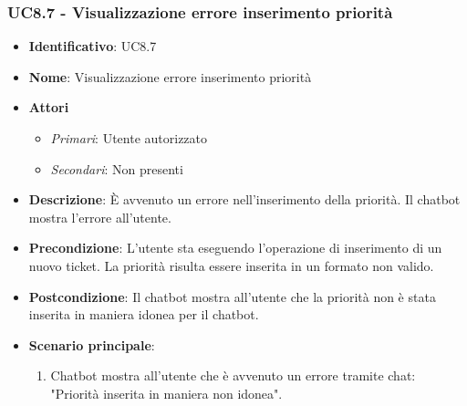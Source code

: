 \subsubsection{UC8.7 - Visualizzazione errore inserimento priorità}
\begin{itemize}
	\item \textbf{Identificativo}: UC8.7
	\item \textbf{Nome}:  Visualizzazione errore inserimento priorità
	\item \textbf{Attori}
	\begin{itemize} 
		\item \textit{Primari}: Utente autorizzato
		\item \textit{Secondari}: Non presenti
	\end{itemize}
	\item \textbf{Descrizione}: È avvenuto un errore nell'inserimento della priorità. Il chatbot mostra l'errore all'utente.
	\item \textbf{Precondizione}: L'utente sta eseguendo l'operazione di inserimento di un nuovo ticket. La priorità risulta essere inserita in un formato non valido. 
	\item \textbf{Postcondizione}: Il chatbot mostra all'utente che la priorità non è stata inserita in maniera idonea per il chatbot.
	\item \textbf{Scenario principale}: \begin{enumerate}
		\item Chatbot mostra all'utente che è avvenuto un errore tramite chat: "Priorità inserita in maniera non idonea".
	\end{enumerate}
\end{itemize}
\newpage